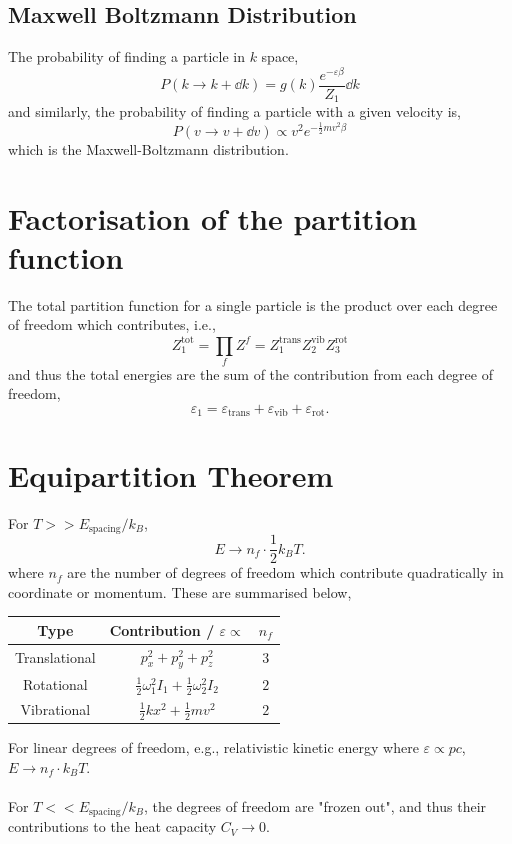 \documentclass{book}
\begin{document}
\subsection{Maxwell Boltzmann Distribution}
The probability of finding a particle in $k$ space,
\begin{equation}
	P(k \to k + \dd{k}) = g(k)\frac{e^{-\varepsilon\beta}}{Z_1}\dd{k}
\end{equation}
and similarly, the probability of finding a particle with a given velocity is,
\begin{equation}
	P(v \to v + \dd{v}) \propto v^2e^{-\frac{1}{2}mv^2\beta}
\end{equation}
which is the Maxwell-Boltzmann distribution.
\section{Factorisation of the partition function}
The total partition function for a single particle is the product over each degree of freedom which contributes, i.e.,
\begin{equation}
	Z_1^{\text{tot}} = \prod_{f} Z^f = Z_1^{\text{trans}}Z_2^{\text{vib}}Z_3^{\text{rot}}
\end{equation}
and thus the total energies are the sum of the contribution from each degree of freedom,
\begin{equation}
	\varepsilon_1 = \varepsilon_{\text{trans}} + \varepsilon_{\text{vib}} + \varepsilon_{\text{rot}}.
\end{equation}
\section{Equipartition Theorem}
For $T >> E_{\text{spacing}}/k_B$,
\begin{equation}
	E \to n_f \cdot \frac{1}{2}k_BT.
\end{equation}
where $n_f$ are the number of degrees of freedom which contribute quadratically in coordinate or momentum. These are summarised below,
\begin{center}
\begin{tabular}{|c|c|c|}
	\hline 
	Type & Contribution / $\varepsilon \propto$ & $n_f$ \\
	\hline
	Translational & $p_x^2 + p_y^2 + p_z^2$ & $3$ \\
	Rotational & $\frac{1}{2}\omega_1^2I_1 + \frac{1}{2}\omega_2^2I_2$ & $2$ \\
	Vibrational & $\frac{1}{2}kx^2 + \frac{1}{2}mv^2$ & $2$ \\
	\hline
\end{tabular}
\end{center}
For linear degrees of freedom, e.g., relativistic kinetic energy where $\varepsilon \propto pc$, $E \to n_f \cdot k_BT$.\\\\
For $T << E_{\text{spacing}}/k_B$, the degrees of freedom are "frozen out", and thus their contributions to the heat capacity $C_V \to 0$.
\end{document}
